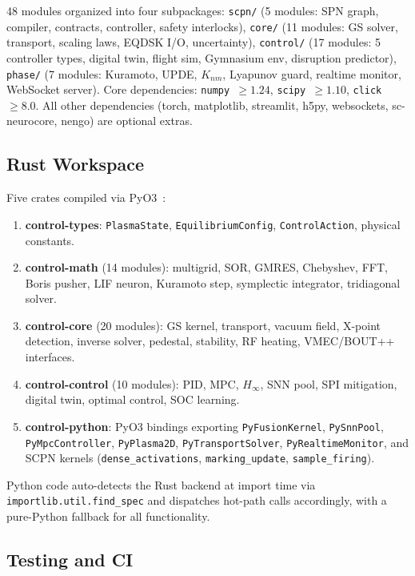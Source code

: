 \documentclass[twocolumn,preprintnumbers,amsmath,amssymb,prl,floatfix]{revtex4-2}
\begin{document}
48 modules organized into four subpackages:
\texttt{scpn/} (5 modules: SPN graph, compiler, contracts,
controller, safety interlocks),
\texttt{core/} (11 modules: GS solver, transport, scaling laws,
EQDSK I/O, uncertainty),
\texttt{control/} (17 modules: 5 controller types, digital twin,
flight sim, Gymnasium env, disruption predictor),
\texttt{phase/} (7 modules: Kuramoto, UPDE, $K_{nm}$, Lyapunov
guard, realtime monitor, WebSocket server).
Core dependencies: \texttt{numpy $\geq 1.24$},
\texttt{scipy $\geq 1.10$}, \texttt{click $\geq 8.0$}.
All other dependencies (torch, matplotlib, streamlit, h5py,
websockets, sc-neurocore, nengo) are optional extras.

\subsection{Rust Workspace}
\label{sec:rust}

Five crates compiled via PyO3~\cite{pyo3}:

\begin{enumerate}
\item \textbf{control-types}: \texttt{PlasmaState},
  \texttt{EquilibriumConfig}, \texttt{ControlAction},
  physical constants.
\item \textbf{control-math} (14 modules): multigrid, SOR,
  GMRES, Chebyshev, FFT, Boris pusher, LIF neuron, Kuramoto
  step, symplectic integrator, tridiagonal solver.
\item \textbf{control-core} (20 modules): GS kernel,
  transport, vacuum field, X-point detection, inverse solver,
  pedestal, stability, RF heating, VMEC/BOUT++ interfaces.
\item \textbf{control-control} (10 modules): PID, MPC,
  $H_\infty$, SNN pool, SPI mitigation, digital twin,
  optimal control, SOC learning.
\item \textbf{control-python}: PyO3 bindings exporting
  \texttt{PyFusionKernel}, \texttt{PySnnPool},
  \texttt{PyMpcController}, \texttt{PyPlasma2D},
  \texttt{PyTransportSolver}, \texttt{PyRealtimeMonitor},
  and SCPN kernels (\texttt{dense\_activations},
  \texttt{marking\_update}, \texttt{sample\_firing}).
\end{enumerate}

Python code auto-detects the Rust backend at import time
via \texttt{importlib.util.find\_spec} and dispatches
hot-path calls accordingly, with a pure-Python fallback
for all functionality.

\subsection{Testing and CI}
\end{document}
